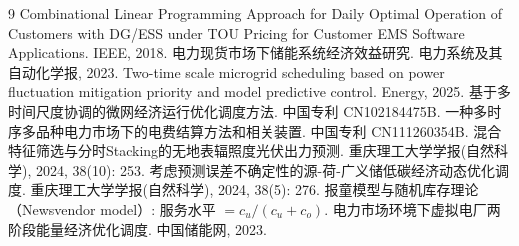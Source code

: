\documentclass[withoutpreface,bwprint]{cumcmthesis}
\begin{document}













\begin{thebibliography}{9}
 Combinational Linear Programming Approach for Daily Optimal Operation of Customers with
DG/ESS under TOU Pricing for Customer EMS Software Applications. IEEE, 2018.
 电力现货市场下储能系统经济效益研究. 电力系统及其自动化学报, 2023.
 Two-time scale microgrid scheduling based on power fluctuation mitigation priority and
model predictive control. Energy, 2025.
 基于多时间尺度协调的微网经济运行优化调度方法. 中国专利 CN102184475B.
 一种多时序多品种电力市场下的电费结算方法和相关装置. 中国专利 CN111260354B.
 混合特征筛选与分时Stacking的无地表辐照度光伏出力预测. 重庆理工大学学报(自然科学), 2024, 38(10): 253.
 考虑预测误差不确定性的源-荷-广义储低碳经济动态优化调度. 重庆理工大学学报(自然科学), 2024, 38(5): 276.
 报童模型与随机库存理论（Newsvendor model\nobreak）: 服务水平 $=c_u/(c_u+c_o)$.
 电力市场环境下虚拟电厂两阶段能量经济优化调度. 中国储能网, 2023.
\end{thebibliography}

\newpage
\begin{appendices}

\end{appendices}
\end{document}
